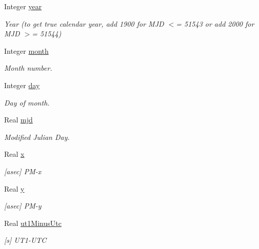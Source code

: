 \begin{DoxyCompactItemize}
\item 
Integer \hyperlink{structostk_1_1physics_1_1coord_1_1frame_1_1provider_1_1iers_1_1_bulletin_a_1_1_prediction_acf3ab00ef756fa94b951a4cb77a6332d}{year}
\begin{DoxyCompactList}\small\item\em Year (to get true calendar year, add 1900 for M\+JD $<$= 51543 or add 2000 for M\+JD $>$= 51544) \end{DoxyCompactList}\item 
Integer \hyperlink{structostk_1_1physics_1_1coord_1_1frame_1_1provider_1_1iers_1_1_bulletin_a_1_1_prediction_a9e58b755cd9f257e79313f3d72d63109}{month}
\begin{DoxyCompactList}\small\item\em Month number. \end{DoxyCompactList}\item 
Integer \hyperlink{structostk_1_1physics_1_1coord_1_1frame_1_1provider_1_1iers_1_1_bulletin_a_1_1_prediction_a38f4ecacf9a7555384c22d273d219f1c}{day}
\begin{DoxyCompactList}\small\item\em Day of month. \end{DoxyCompactList}\item 
Real \hyperlink{structostk_1_1physics_1_1coord_1_1frame_1_1provider_1_1iers_1_1_bulletin_a_1_1_prediction_a065748c87fb3d0d86729f7f64cfacdf7}{mjd}
\begin{DoxyCompactList}\small\item\em Modified Julian Day. \end{DoxyCompactList}\item 
Real \hyperlink{structostk_1_1physics_1_1coord_1_1frame_1_1provider_1_1iers_1_1_bulletin_a_1_1_prediction_a06de4fb825a1e7822b4b65fc01ad9b7b}{x}
\begin{DoxyCompactList}\small\item\em \mbox{[}asec\mbox{]} P\+M-\/x \end{DoxyCompactList}\item 
Real \hyperlink{structostk_1_1physics_1_1coord_1_1frame_1_1provider_1_1iers_1_1_bulletin_a_1_1_prediction_a2d4453b2da1493803edccff30bfac80c}{y}
\begin{DoxyCompactList}\small\item\em \mbox{[}asec\mbox{]} P\+M-\/y \end{DoxyCompactList}\item 
Real \hyperlink{structostk_1_1physics_1_1coord_1_1frame_1_1provider_1_1iers_1_1_bulletin_a_1_1_prediction_afbc940dafef779a0d29603782aa93d36}{ut1\+Minus\+Utc}
\begin{DoxyCompactList}\small\item\em \mbox{[}s\mbox{]} U\+T1-\/\+U\+TC \end{DoxyCompactList}\end{DoxyCompactItemize}


